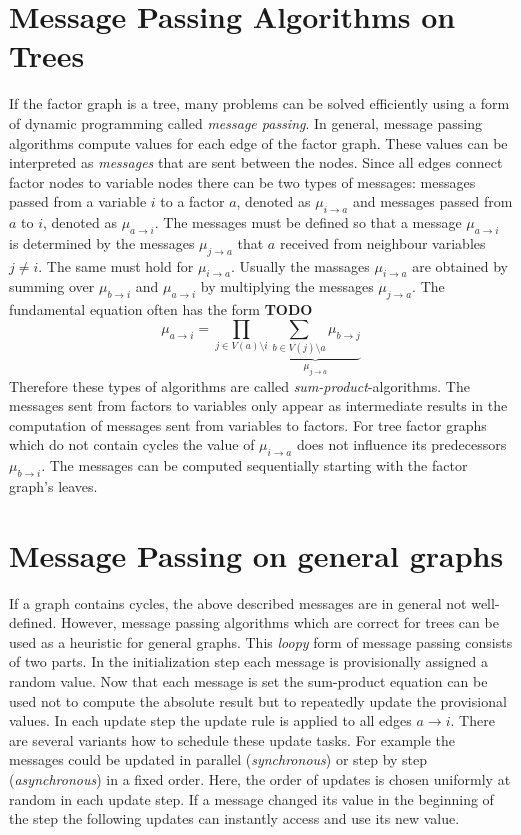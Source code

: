 \section{Message Passing Algorithms on Trees}

If the factor graph is a tree, many problems can be solved efficiently using a form of dynamic programming called \emph{message passing}. \newline 
In general, message passing algorithms compute values for each edge of the factor graph. These values can be interpreted as \emph{messages} that are sent between the nodes. Since all edges connect factor nodes to variable nodes there can be two types of messages: messages passed from a variable $i$ to a factor $a$, denoted as $\mu_{i \rightarrow a}$ and messages passed from $a$ to $i$, denoted as $\mu_{a \rightarrow i}$. \newline
The messages must be defined so that a message $\mu_{a \rightarrow i}$ is determined by the messages $\mu_{j \rightarrow a}$ that $a$ received from neighbour variables $j \neq i$. 
The same must hold for $\mu_{i \rightarrow a}$. \newline
Usually the massages $\mu_{i \rightarrow a}$ are obtained by summing over $\mu_{b \rightarrow i}$ and $\mu_{a \rightarrow i}$ by multiplying the messages $\mu_{j \rightarrow a}$. The fundamental equation often has the form \textbf{TODO} $$\mu_{a \rightarrow i} = \prod_{j \in V(a) \setminus i} \underbrace{\sum_{b \in V(j) \setminus a} \mu_{b \rightarrow j}}_{\mu_{j \rightarrow a}}$$ Therefore these types of algorithms are called \emph{sum-product}-algorithms. The messages sent from factors to variables only appear as intermediate results in the computation of messages sent from variables to factors. \newline
For tree factor graphs which do not contain cycles the value of $\mu_{i \rightarrow a}$ does not influence its predecessors $\mu_{b \rightarrow i}$. The messages can be computed sequentially starting with the factor graph's leaves.


\section{Message Passing on general graphs}
If a graph contains cycles, the above described messages are in general not well-defined. However, message passing algorithms which are correct for trees can be used as a heuristic for general graphs. \newline
This \emph{loopy} form of message passing consists of two parts. In the initialization  step each message is provisionally assigned a random value. Now that each message is set the sum-product equation can be used not to compute the absolute result but to repeatedly update the provisional values. In each update step the update rule is applied to all edges $a \rightarrow i$. There are several variants how to schedule these update tasks. For example the messages could be updated in parallel (\emph{synchronous}) or step by step (\emph{asynchronous}) in a fixed order. Here, the order of updates is chosen uniformly at random in each update step. If a message changed its value in the beginning of the step the following updates can instantly access and use its new value. 

